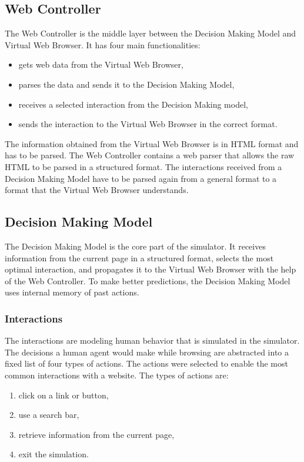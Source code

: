 \subsection{Web Controller}

The Web Controller is the middle layer between the Decision Making Model and Virtual Web Browser. It has four main functionalities:

\begin{itemize}
    \item gets web data from the Virtual Web Browser,
    \item parses the data and sends it to the Decision Making Model,
    \item receives a selected interaction from the Decision Making model,
    \item sends the interaction to the Virtual Web Browser in the correct format.
\end{itemize}

The information obtained from the Virtual Web Browser is in HTML format and has to be parsed. The Web Controller contains a web parser that allows the raw HTML to be parsed in a structured format. The interactions received from a Decision Making Model have to be parsed again from a general format to a format that the Virtual Web Browser understands. 


\subsection{Decision Making Model}
\label{dmm}

The Decision Making Model is the core part of the simulator. It receives information from the current page in a structured format, selects the most optimal interaction, and propagates it to the Virtual Web Browser with the help of the Web Controller. To make better predictions, the Decision Making Model uses internal memory of past actions.

\subsubsection{Interactions}

The interactions are modeling human behavior that is simulated in the simulator. The decisions a human agent would make while browsing are abstracted into a fixed list of four types of actions. The actions were selected to enable the most common interactions with a website. The types of actions are:

\begin{enumerate}
    \item click on a link or button,
    \item use a search bar,
    \item retrieve information from the current page,
    \item exit the simulation.
\end{enumerate}

